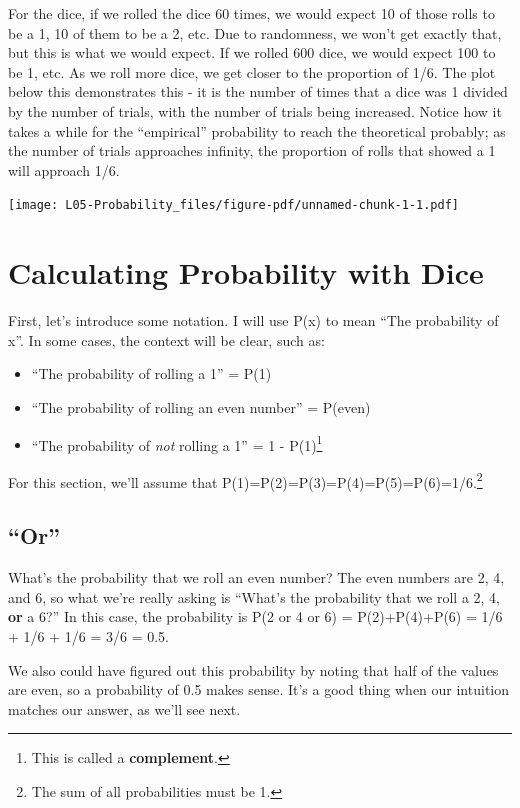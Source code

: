 \documentclass[
  letterpaper,
  DIV=11,
  numbers=noendperiod,
  oneside]{scrreprt}
\providecommand{\tightlist}{%
  \setlength{\itemsep}{0pt}\setlength{\parskip}{0pt}}\usepackage{longtable,booktabs,array}
\begin{document}
For the dice, if we rolled the dice 60 times, we would expect 10 of
those rolls to be a 1, 10 of them to be a 2, etc. Due to randomness, we
won't get exactly that, but this is what we would expect. If we rolled
600 dice, we would expect 100 to be 1, etc. As we roll more dice, we get
closer to the proportion of 1/6. The plot below this demonstrates this -
it is the number of times that a dice was 1 divided by the number of
trials, with the number of trials being increased. Notice how it takes a
while for the ``empirical'' probability to reach the theoretical
probably; as the number of trials approaches infinity, the proportion of
rolls that showed a 1 will approach 1/6.

\texttt{[image: L05-Probability\_files/figure-pdf/unnamed-chunk-1-1.pdf]}

\hypertarget{calculating-probability-with-dice}{%
\section{Calculating Probability with
Dice}\label{calculating-probability-with-dice}}

First, let's introduce some notation. I will use P(x) to mean ``The
probability of x''. In some cases, the context will be clear, such as:

\begin{itemize}
\tightlist
\item
  ``The probability of rolling a 1'' = P(1)
\item
  ``The probability of rolling an even number'' = P(even)
\item
  ``The probability of \emph{not} rolling a 1'' = 1 - P(1)\footnote{This
    is called a \textbf{complement}.}
\end{itemize}

For this section, we'll assume that
P(1)=P(2)=P(3)=P(4)=P(5)=P(6)=1/6.\footnote{The sum of all probabilities
  must be 1.}

\hypertarget{or}{%
\subsection{``Or''}\label{or}}

What's the probability that we roll an even number? The even numbers are
2, 4, and 6, so what we're really asking is ``What's the probability
that we roll a 2, 4, \textbf{or} a 6?'' In this case, the probability is
P(2 or 4 or 6) = P(2)+P(4)+P(6) = 1/6 + 1/6 + 1/6 = 3/6 = 0.5.

We also could have figured out this probability by noting that half of
the values are even, so a probability of 0.5 makes sense. It's a good
thing when our intuition matches our answer, as we'll see next.
\end{document}
